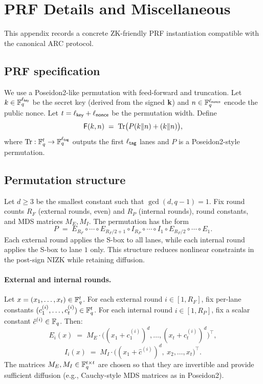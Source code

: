 \section{PRF Details and Miscellaneous}
\label{app:prf}

This appendix records a concrete ZK-friendly PRF instantiation compatible with the canonical ARC protocol.

\subsection{PRF specification}
We use a Poseidon2-like permutation with feed-forward and truncation. Let \(k\in\mathbb{F}_q^{\ell_{\mathsf{key}}}\) be the secret
key (derived from the signed \(\mathbf{k}\)) and \(n\in\mathbb{F}_q^{\ell_{\mathsf{nonce}}}\) encode the public nonce. Let
\(t=\ell_{\mathsf{key}}+\ell_{\mathsf{nonce}}\) be the permutation width. Define
\[
  \mathsf{F}(k,n) \;=\; \mathrm{Tr}\big(P(k\Vert n) + (k\Vert n)\big),
\]
where \(\mathrm{Tr}:\mathbb{F}_q^{t}\to \mathbb{F}_q^{\ell_{\mathsf{tag}}}\) outputs the first \(\ell_{\mathsf{tag}}\) lanes and \(P\) is a
Poseidon2-style permutation.

\subsection{Permutation structure}
Let \(d\ge 3\) be the smallest constant such that \(\gcd(d,q-1)=1\). Fix round counts \(R_F\) (external rounds, even) and
\(R_P\) (internal rounds), round constants, and MDS matrices \(M_E,M_I\). The permutation has the form
\[
  P \;=\; E_{R_F}\circ\cdots\circ E_{R_F/2+1}\circ I_{R_P}\circ\cdots\circ I_{1}\circ E_{R_F/2}\circ\cdots\circ E_1.
\]
Each external round applies the S-box to all lanes, while each internal round applies the S-box to lane \(1\) only.
This structure reduces nonlinear constraints in the post-sign NIZK while retaining diffusion.

\paragraph{External and internal rounds.}
Let \(x=(x_1,\dots,x_t)\in\mathbb{F}_q^t\). For each external round \(i\in[1,R_F]\), fix per-lane constants
\((c^{(i)}_1,\dots,c^{(i)}_t)\in\mathbb{F}_q^t\). For each internal round \(i\in[1,R_P]\), fix a scalar constant \(\hat c^{(i)}\in\mathbb{F}_q\).
Then:
\[
  E_i(x) \;=\; M_E\cdot \bigl((x_1+c^{(i)}_1)^d,\dots,(x_t+c^{(i)}_t)^d\bigr)^\top,
\]
\[
  I_i(x) \;=\; M_I\cdot \bigl((x_1+\hat c^{(i)})^d,\ x_2,\dots,x_t\bigr)^\top.
\]
The matrices \(M_E,M_I\in\mathbb{F}_q^{t\times t}\) are chosen so that they are invertible and provide sufficient diffusion (e.g.,
Cauchy-style MDS matrices as in Poseidon2).

